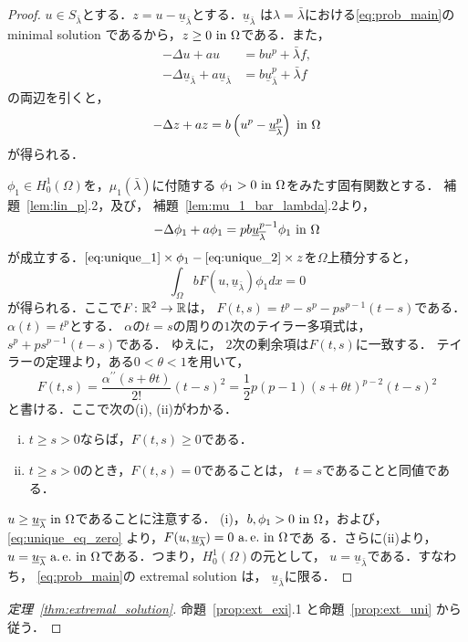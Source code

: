 \begin{proof}
 $u \in S_{\bar{\lambda}}$とする．$z = u -
 \underline{u}_{\bar{\lambda}}$とする．$\underline{u}_{\bar{\lambda}}$
 は$\lambda = \bar{\lambda}$における\ref{eq:prob_main}の
 minimal solution であるから，$z \geq 0 ~\text{in}~ \Omega$である．また，
 \begin{align*}
  -\Delta u + au &= bu^p + \bar{\lambda} f, \\
  -\Delta \underline{u}_{\bar{\lambda}} + a
  \underline{u}_{\bar{\lambda}}
  &= b \underline{u}_{\bar{\lambda}}^p + \bar{\lambda} f
 \end{align*}
 の両辺を引くと，
 \begin{equation}
  -\Delta z + az = b \left( u^p - \underline{u}_{\overline{\lambda}}^p
 \right) ~\text{in}~ \Omega \label{eq:unique_1}
 \end{equation}
 が得られる．
 
 $\phi_1 \in H_0^1(\Omega)$を，$\mu_1(\bar{\lambda})$に付随する
 $\phi_1 > 0 ~\text{in}~ \Omega$をみたす固有関数とする．
 補題~\ref{lem:lin_p}.2，及び，
 補題~\ref{lem:mu_1_bar_lambda}.2より，
 \begin{equation}
  -\Delta \phi_1 + a\phi_1 = pb \underline{u}_{\overline{\lambda}}^{p-1}
   \phi_1 ~\text{in}~ \Omega \label{eq:unique_2}
 \end{equation}
 が成立する．$\text{\eqref{eq:unique_1}} \times \phi_1 -
 \text{\eqref{eq:unique_2}} \times z$を$\Omega$上積分すると，
 \begin{equation}
  \int_\Omega b F(u, \underline{u}_{\bar{\lambda}}) \phi_1 dx = 0
   \label{eq:unique_eq_zero}
 \end{equation}
 が得られる．ここで$F \colon \mathbb{R}^2 \to \mathbb{R}$は，
 $F(t, s) = t^p - s^p - ps^{p-1}(t-s)$である．
 $\alpha(t) = t^p$とする．
 $\alpha$の$t = s$の周りの$1$次のテイラー多項式は，
 $s^p + ps^{p-1}(t-s)$である．
 ゆえに，
 $2$次の剰余項は$F(t, s)$に一致する．
 テイラーの定理より，ある$0 < \theta < 1$を用いて，
 \[
  F(t, s) = \frac{\alpha^{\prime\prime}(s + \theta t)}{2!} (t-s)^2 = \frac{1}{2}
 p(p-1) (s+ \theta t)^{p-2} (t-s)^2
 \]
 と書ける．ここで次の(i), (ii)がわかる．
 \begin{enumerate}[(i)]
  \item $t \geq s > 0$ならば，$F(t, s) \geq 0$である．
  \item $t \geq s > 0$のとき，$F(t, s) = 0$であることは，
        $t = s$であることと同値である．
 \end{enumerate}
 $u \geq \underline{u}_{\overline{\lambda}} ~\text{in}~ \Omega$であることに注意する．
 (i)，$b, \phi_1 > 0 ~\text{in}~ \Omega$，および，\eqref{eq:unique_eq_zero}
 より，$F(u, \underline{u}_{\overline{\lambda}}) = 0 ~\text{a.\,e.}~ \text{in}~ \Omega$であ
 る．さらに(ii)より，$u = \underline{u}_{\overline{\lambda}} ~\text{a.\,e.}~ \text{in}~
 \Omega$である．つまり，$H_0^1(\Omega)$の元として，
 $u = \underline{u}_{\bar{\lambda}}$である．すなわち，
 \ref{eq:prob_main}の extremal solution は，
 $\underline{u}_{\bar{\lambda}}$に限る． \qedhere
\end{proof}

\begin{proof}[定理~\ref{thm:extremal_solution}]
 命題~\ref{prop:ext_exi}.1 と命題~\ref{prop:ext_uni} から従う．\qedhere
\end{proof}

